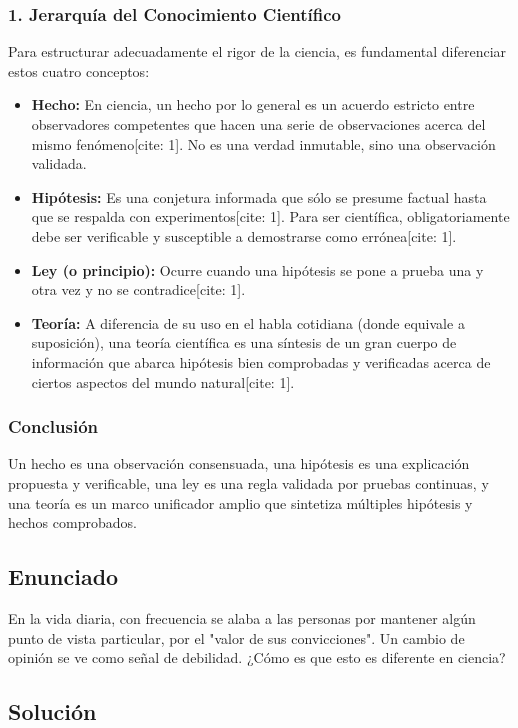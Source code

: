 \documentclass[12pt, a4paper]{article}
\begin{document}
\subsubsection*{1. Jerarquía del Conocimiento Científico}
Para estructurar adecuadamente el rigor de la ciencia, es fundamental diferenciar estos cuatro conceptos:
\begin{itemize}
    \item \textbf{Hecho:} En ciencia, un hecho por lo general es un acuerdo estricto entre observadores competentes que hacen una serie de observaciones acerca del mismo fenómeno[cite: 1]. No es una verdad inmutable, sino una observación validada.
    \item \textbf{Hipótesis:} Es una conjetura informada que sólo se presume factual hasta que se respalda con experimentos[cite: 1]. Para ser científica, obligatoriamente debe ser verificable y susceptible a demostrarse como errónea[cite: 1].
    \item \textbf{Ley (o principio):} Ocurre cuando una hipótesis se pone a prueba una y otra vez y no se contradice[cite: 1].
    \item \textbf{Teoría:} A diferencia de su uso en el habla cotidiana (donde equivale a suposición), una teoría científica es una síntesis de un gran cuerpo de información que abarca hipótesis bien comprobadas y verificadas acerca de ciertos aspectos del mundo natural[cite: 1].
\end{itemize}

\subsubsection*{Conclusión}
Un hecho es una observación consensuada, una hipótesis es una explicación propuesta y verificable, una ley es una regla validada por pruebas continuas, y una teoría es un marco unificador amplio que sintetiza múltiples hipótesis y hechos comprobados.

\newpage

\subsection*{Enunciado}
En la vida diaria, con frecuencia se alaba a las personas por mantener algún punto de vista particular, por el "valor de sus convicciones". Un cambio de opinión se ve como señal de debilidad. ¿Cómo es que esto es diferente en ciencia?

\subsection*{Solución}
\end{document}
